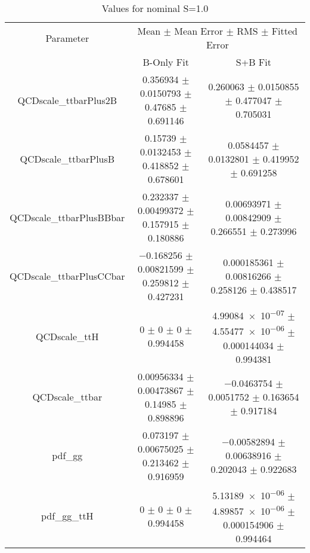 \begin{table}
\centering
\caption{Values for nominal S=1.0}
\begin{tabular}{ccc}
\toprule
Parameter & \multicolumn{2}{c}{Mean $\pm$ Mean Error $\pm$ RMS $\pm$ Fitted Error}\\
 & B-Only Fit & S+B Fit\\
\midrule
QCDscale\_ttbarPlus2B & \num{0.356934} $\pm$ \num{0.0150793} $\pm$ \num{0.47685} $\pm$ \num{0.691146} & \num{0.260063} $\pm$ \num{0.0150855} $\pm$ \num{0.477047} $\pm$ \num{0.705031}\\
QCDscale\_ttbarPlusB & \num{0.15739} $\pm$ \num{0.0132453} $\pm$ \num{0.418852} $\pm$ \num{0.678601} & \num{0.0584457} $\pm$ \num{0.0132801} $\pm$ \num{0.419952} $\pm$ \num{0.691258}\\
QCDscale\_ttbarPlusBBbar & \num{0.232337} $\pm$ \num{0.00499372} $\pm$ \num{0.157915} $\pm$ \num{0.180886} & \num{0.00693971} $\pm$ \num{0.00842909} $\pm$ \num{0.266551} $\pm$ \num{0.273996}\\
QCDscale\_ttbarPlusCCbar & \num{-0.168256} $\pm$ \num{0.00821599} $\pm$ \num{0.259812} $\pm$ \num{0.427231} & \num{0.000185361} $\pm$ \num{0.00816266} $\pm$ \num{0.258126} $\pm$ \num{0.438517}\\
QCDscale\_ttH & \num{0} $\pm$ \num{0} $\pm$ \num{0} $\pm$ \num{0.994458} & \num{4.99084e-07} $\pm$ \num{4.55477e-06} $\pm$ \num{0.000144034} $\pm$ \num{0.994381}\\
QCDscale\_ttbar & \num{0.00956334} $\pm$ \num{0.00473867} $\pm$ \num{0.14985} $\pm$ \num{0.898896} & \num{-0.0463754} $\pm$ \num{0.0051752} $\pm$ \num{0.163654} $\pm$ \num{0.917184}\\
pdf\_gg & \num{0.073197} $\pm$ \num{0.00675025} $\pm$ \num{0.213462} $\pm$ \num{0.916959} & \num{-0.00582894} $\pm$ \num{0.00638916} $\pm$ \num{0.202043} $\pm$ \num{0.922683}\\
pdf\_gg\_ttH & \num{0} $\pm$ \num{0} $\pm$ \num{0} $\pm$ \num{0.994458} & \num{5.13189e-06} $\pm$ \num{4.89857e-06} $\pm$ \num{0.000154906} $\pm$ \num{0.994464}\\
\bottomrule
\end{tabular}
\end{table}